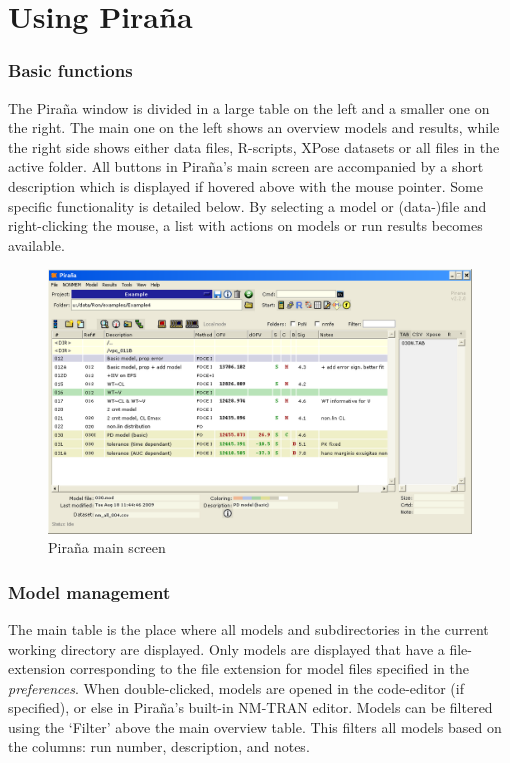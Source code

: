 \documentclass[a4,11pt]{report} \usepackage[pdftex]{graphicx}
\begin{document}
\pagebreak
\section{Using Pira\~na}

\subsubsection*{Basic functions} The Pira\~na window is divided in a
large table on the left and a smaller one on the right. The main one
on the left shows an overview models and results, while the right side
shows either data files, R-scripts, XPose datasets or all files in the
active folder. All buttons in Pira\~na's main screen are accompanied
by a short description which is displayed if hovered above with the
mouse pointer. Some specific functionality is detailed below. By
selecting a model or (data-)file and right-clicking the mouse, a list
with actions on models or run results becomes available.

\begin{figure}[hb] \centering
    \includegraphics[scale=0.3]{images/main_screen_2.png}
    \caption{Pira\~na main screen}
\end{figure}

\subsubsection*{Model management} The main table is the place
where all models and subdirectories in the current working directory
are displayed. Only models are displayed that have a file-extension
corresponding to the file extension for model files specified in the
\textit{preferences}. When double-clicked, models are opened in the
code-editor (if specified), or else in Pira\~na's built-in NM-TRAN
editor. Models can be filtered using the `Filter' above the main
overview table. This filters all models based on the columns: run
number, description, and notes.\\
\end{document}
